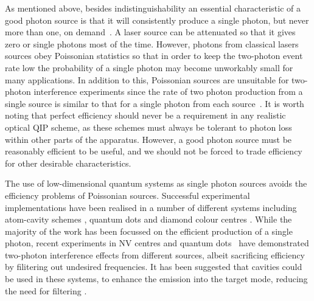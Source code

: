 As mentioned above, besides indistinguishability an essential characteristic of a good photon source is that it will consistently produce a single photon, but never more than one, on demand~\cite{lounis05}.  A laser source can be attenuated so that it gives zero or single photons most of the time. However, photons from classical lasers sources obey Poissonian statistics so that in order to keep the two-photon event rate low the probability of a single photon may become unworkably small for many applications. In addition to this, Poissonian sources are unsuitable for two-photon interference experiments since the rate of two photon production from a single source is similar to that for a single photon from each source~\cite{kok10}.
It is worth noting that perfect efficiency should never be a requirement in any realistic optical QIP scheme, as these schemes must always be tolerant to photon loss within other parts of the apparatus. However, a good photon source must be reasonably efficient to be useful, and we should not be forced to trade efficiency for other desirable characteristics.


The use of low-dimensional quantum systems as single photon sources avoids the efficiency problems of Poissonian sources. Successful experimental implementations have been realised in a number of different systems including atom-cavity schemes \cite{rempe:prl:02, kimble:sci:04, grangier:sci:05, rempe:nat-phys:07}, quantum dots \cite{arakawa:nat-mat:06, imamoglu:nat:07} and diamond colour centres \cite{roch:njp:07, bernien:prl:12, lukin:prl:12}. While the majority of the work has been focussed on the efficient production of a single photon, recent experiments in NV centres \cite{bernien:prl:12, lukin:prl:12} and quantum dots~\cite{flagg10, patel10} have demonstrated two-photon interference effects from different sources, albeit sacrificing efficiency by filitering out undesired frequencies. It has been suggested that cavities could be used in these systems, to enhance the emission into the target mode, reducing the need for filtering \cite{greentree:08}.

